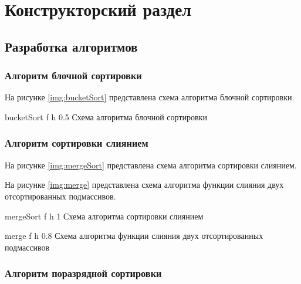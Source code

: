 \chapter{Конструкторский раздел}

\section{Разработка алгоритмов}

\subsection{Алгоритм блочной сортировки}

На рисунке \ref{img:bucketSort} представлена схема алгоритма блочной сортировки.

{bucketSort} %
{f} %
{h} %
{0.5\textwidth} %
{Схема алгоритма блочной сортировки} %

\clearpage

\subsection{Алгоритм сортировки слиянием}

На рисунке \ref{img:mergeSort} представлена схема алгоритма сортировки слиянием.

На рисунке \ref{img:merge} представлена схема алгоритма функции слияния двух отсортированных подмассивов.

{mergeSort} %
{f} %
{h} %
{1\textwidth} %
{Схема алгоритма сортировки слиянием} %

{merge} %
{f} %
{h} %
{0.8\textwidth} %
{Схема алгоритма функции слияния двух отсортированных подмассивов} %

\clearpage

\subsection{Алгоритм поразрядной сортировки}

